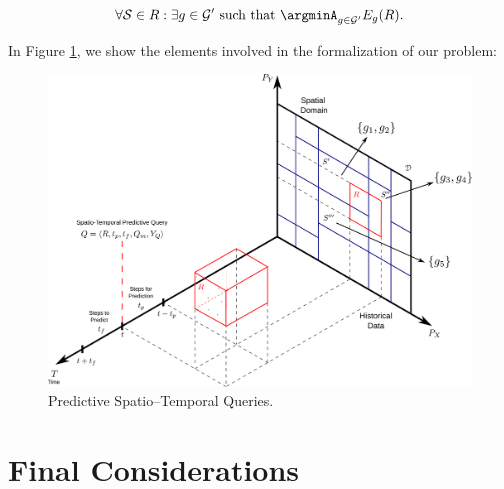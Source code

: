 \begin{equation}
\forall \mathcal{S} \in R: \exists g \in \mathcal{G'} \,\,\textrm{such that} \,\, \argminA_{g\in\mathcal{G'}} E_{g}(R).
\end{equation}

\noindent In Figure \ref{fig:time-series}, we show the elements involved in the formalization of our problem:
\begin{center}
	\begin{figure}[htb]
		\centering
		\includegraphics[scale=0.15]{../Figures/RepresentationTimeSeries}
		\caption{Predictive Spatio--Temporal Queries.}
		\label{fig:time-series}
	\end{figure}
\end{center}

\section{Final Considerations}